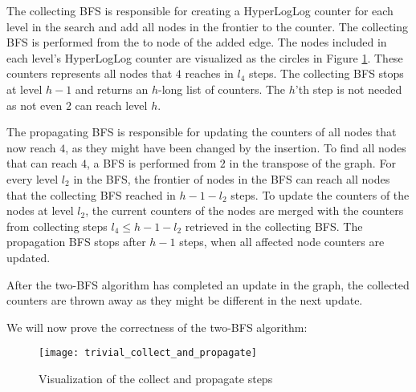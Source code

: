 The collecting BFS is responsible for creating a HyperLogLog counter for each level in the search and add all nodes in the frontier to the counter. The collecting BFS is performed from the to node of the added edge. The nodes included in each level's HyperLogLog counter are visualized as the circles in Figure \ref{fig:collect_and_propagate}. These counters represents all nodes that $4$ reaches in $l_4$ steps. The collecting BFS stops at level $h-1$ and returns an $h$-long list of counters. The $h$'th step is not needed as not even $2$ can reach level $h$.

The propagating BFS is responsible for updating the counters of all nodes that now reach $4$, as they might have been changed by the insertion. To find all nodes that can reach $4$, a BFS is performed from $2$ in the transpose of the graph. For every level $l_2$ in the BFS, the frontier of nodes in the BFS can reach all nodes that the collecting BFS reached in $h-1-l_2$ steps. To update the counters of the nodes at level $l_2$, the current counters of the nodes are merged with the counters from collecting steps $l_4 \leq h-1-l_2$ retrieved in the collecting BFS. The propagation BFS stops after $h-1$ steps, when all affected node counters are updated.

After the two-BFS algorithm has completed an update in the graph, the collected counters are thrown away as they might be different in the next update.

We will now prove the correctness of the two-BFS algorithm:

\begin{figure}[h]
\centering
\texttt{[image: trivial\_collect\_and\_propagate]}    
\captionsetup{justification=centering}
\caption {Visualization of the collect and propagate steps}
\label{fig:collect_and_propagate}
\end{figure}


